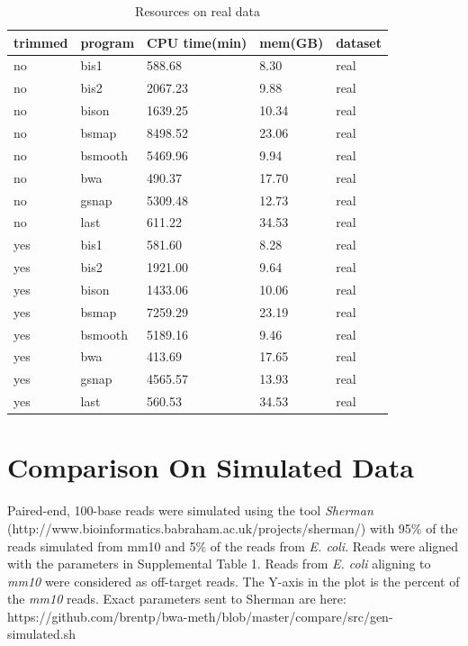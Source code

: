 \documentclass[12pt]{article}
\begin{document}
\begin{table}[H]
    \centering
    \caption{Resources on real data}
    \begin{tabular}{lllll} \hline
    trimmed & program & CPU time(min) & mem(GB) & dataset \\ \hline

no &    bis1 & 588.68 & 8.30 & real \\
no &    bis2 & 2067.23 & 9.88 & real \\
no &    bison & 1639.25 & 10.34 & real \\
no &    bsmap & 8498.52 & 23.06 & real \\
no &    bsmooth & 5469.96 & 9.94 & real \\
no &    bwa & 490.37 & 17.70 & real \\
no &    gsnap & 5309.48 & 12.73 & real \\
no &    last & 611.22 & 34.53 & real \\

yes &    bis1 & 581.60 & 8.28 & real \\
yes &    bis2 & 1921.00 & 9.64 & real \\
yes &    bison & 1433.06 & 10.06 & real \\
yes &    bsmap & 7259.29 & 23.19 & real \\
yes &    bsmooth & 5189.16 & 9.46 & real \\
yes &    bwa & 413.69 & 17.65 & real \\
yes &    gsnap & 4565.57 & 13.93 & real \\
yes &    last & 560.53 & 34.53 & real \\

    \end{tabular}
\end{table}

\section{Comparison On Simulated Data}
Paired-end, 100-base reads were simulated using the tool \emph{Sherman}
(http://www.bioinformatics.babraham.ac.uk/projects/sherman/) with 95\% of the
reads simulated from mm10 and 5\% of the reads from \emph{E. coli}. 
Reads were aligned with the parameters in Supplemental Table 1.
Reads from \emph{E. coli} aligning to \emph{mm10} were considered as
off-target reads. The Y-axis in the plot is the percent of the \emph{mm10}
reads. Exact parameters sent to Sherman are here:
https://github.com/brentp/bwa-meth/blob/master/compare/src/gen-simulated.sh
\end{document}
